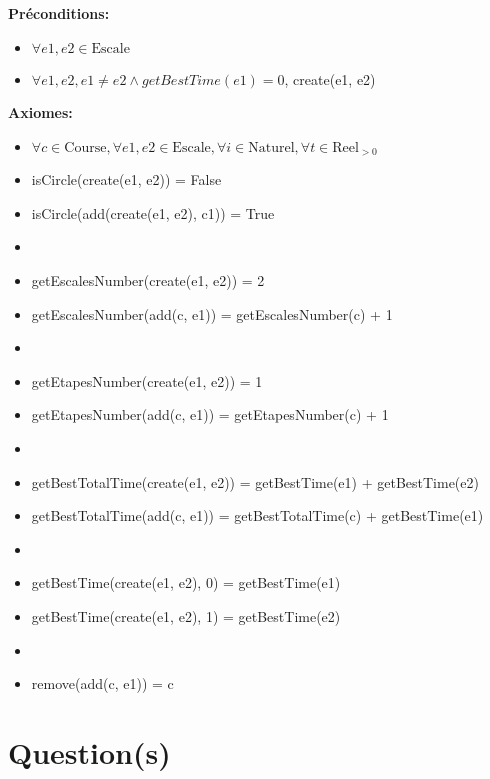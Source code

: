 \documentclass[a4paper, 11pt, oneside]{article}
\begin{document}
\textbf{Préconditions:}
\begin{itemize}
    \item[] $\forall e1, e2 \in \text{Escale}$
    \item[] $\forall e1, e2, e1 \neq e2 \land getBestTime(e1) = 0$, create(e1, e2)
\end{itemize}

\textbf{Axiomes:}
\begin{itemize}
    \item[] $\forall c \in \text{Course}, \forall e1, e2 \in \text{Escale}, \forall i \in \text{Naturel}, \forall t \in \text{Reel}_{>0}$
    \item[] isCircle(create(e1, e2)) = False
    \item[] isCircle(add(create(e1, e2), c1)) = True
    \item[]
    \item[] getEscalesNumber(create(e1, e2)) = 2
    \item[] getEscalesNumber(add(c, e1)) = getEscalesNumber(c) + 1
    \item[]
    \item[] getEtapesNumber(create(e1, e2)) = 1
    \item[] getEtapesNumber(add(c, e1)) = getEtapesNumber(c) + 1
    \item[]
    \item[] getBestTotalTime(create(e1, e2)) = getBestTime(e1) + getBestTime(e2)
    \item[] getBestTotalTime(add(c, e1)) = getBestTotalTime(c) + getBestTime(e1)
    \item[]
    \item[] getBestTime(create(e1, e2), 0) = getBestTime(e1)
    \item[] getBestTime(create(e1, e2), 1) = getBestTime(e2)
    \item[]
    \item[] remove(add(c, e1)) = c
\end{itemize}


\section{Question(s)}

\end{document}
